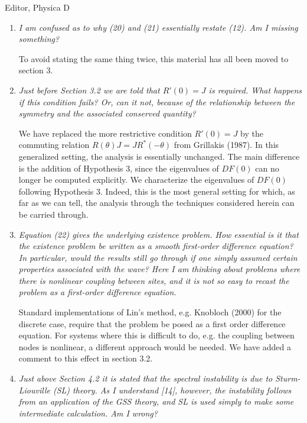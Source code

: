 \documentclass[11pt]{letter}
\begin{document}
\begin{letter}{Editor, Physica D}
\begin{enumerate}
\item \emph{I am confused as to why (20) and (21) essentially restate (12). Am I missing something?}

\vspace{4mm}
To avoid stating the same thing twice, this material has all been moved to section 3. 
\vspace{4mm}

\item \emph{Just before Section 3.2 we are told that $R'(0) = J$ is required. What happens if this condition fails? Or, can it not, because of the relationship between the symmetry and the associated conserved quantity?}

\vspace{4mm}
We have replaced the more restrictive condition $R'(0) = J$ by the commuting relation $R(\theta) J = J R^*(-\theta)$ from Grillakis (1987). In this generalized setting, the analysis is essentially unchanged. The main difference is the addition of Hypothesis 3, since the eigenvalues of $DF(0)$ can no longer be computed explicitly. We characterize the eigenvalues of $DF(0)$ following Hypothesis 3. Indeed, this is the most general setting for which, as far as
we can tell, the analysis through the techniques considered herein
can be carried through.
\vspace{4mm}

\item \emph{Equation (22) gives the underlying existence problem. How essential is it that the existence problem be written as a smooth first-order difference equation? In particular, would the results still go through if one simply assumed certain properties associated with the wave? Here I am thinking about problems where there is nonlinear coupling between sites, and it is not so easy to recast the problem as a first-order difference equation.}

\vspace{4mm}
Standard implementations of Lin's method, e.g. Knobloch (2000) for the discrete case, require that the problem be posed as a first order difference equation. For systems where this is difficult to do, e.g. the coupling between nodes is nonlinear, a different approach would be needed. We have added a comment to this effect in section 3.2.
\vspace{4mm}

\item \emph{Just above Section 4.2 it is stated that the spectral instability is due to Sturm-Liouville (SL) theory. As I understand [14], however, the instability follows from an application of the GSS theory, and SL is used simply to make some intermediate calculation. Am I wrong?}


\end{enumerate}
\end{letter}
\end{document}
